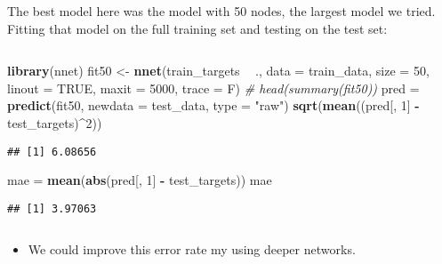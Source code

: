 \documentclass[10pt,ignorenonframetext,]{beamer}
\newenvironment{Shaded}{\begin{snugshade}}{\end{snugshade}}
\newcommand{\CommentTok}[1]{\textcolor[rgb]{0.56,0.35,0.01}{\textit{#1}}}
\newcommand{\DataTypeTok}[1]{\textcolor[rgb]{0.13,0.29,0.53}{#1}}
\newcommand{\DecValTok}[1]{\textcolor[rgb]{0.00,0.00,0.81}{#1}}
\newcommand{\KeywordTok}[1]{\textcolor[rgb]{0.13,0.29,0.53}{\textbf{#1}}}
\newcommand{\NormalTok}[1]{#1}
\newcommand{\OperatorTok}[1]{\textcolor[rgb]{0.81,0.36,0.00}{\textbf{#1}}}
\newcommand{\OtherTok}[1]{\textcolor[rgb]{0.56,0.35,0.01}{#1}}
\newcommand{\StringTok}[1]{\textcolor[rgb]{0.31,0.60,0.02}{#1}}
\providecommand{\tightlist}{%
  \setlength{\itemsep}{0pt}\setlength{\parskip}{0pt}}
\begin{document}
\begin{frame}[fragile]

The best model here was the model with 50 nodes, the largest model we
tried. Fitting that model on the full training set and testing on the
test set:

\(~\)

\scriptsize

\begin{Shaded}
\begin{Highlighting}[]
\KeywordTok{library}\NormalTok{(nnet)}
\NormalTok{fit50 <-}\StringTok{ }\KeywordTok{nnet}\NormalTok{(train_targets }\OperatorTok{~}\StringTok{ }\NormalTok{., }\DataTypeTok{data =}\NormalTok{ train_data, }\DataTypeTok{size =} \DecValTok{50}\NormalTok{, }\DataTypeTok{linout =} \OtherTok{TRUE}\NormalTok{, }
    \DataTypeTok{maxit =} \DecValTok{5000}\NormalTok{, }\DataTypeTok{trace =}\NormalTok{ F)}
\CommentTok{# head(summary(fit50))}
\NormalTok{pred =}\StringTok{ }\KeywordTok{predict}\NormalTok{(fit50, }\DataTypeTok{newdata =}\NormalTok{ test_data, }\DataTypeTok{type =} \StringTok{"raw"}\NormalTok{)}
\KeywordTok{sqrt}\NormalTok{(}\KeywordTok{mean}\NormalTok{((pred[, }\DecValTok{1}\NormalTok{] }\OperatorTok{-}\StringTok{ }\NormalTok{test_targets)}\OperatorTok{^}\DecValTok{2}\NormalTok{))}
\end{Highlighting}
\end{Shaded}

\begin{verbatim}
## [1] 6.08656
\end{verbatim}

\begin{Shaded}
\begin{Highlighting}[]
\NormalTok{mae =}\StringTok{ }\KeywordTok{mean}\NormalTok{(}\KeywordTok{abs}\NormalTok{(pred[, }\DecValTok{1}\NormalTok{] }\OperatorTok{-}\StringTok{ }\NormalTok{test_targets))}
\NormalTok{mae}
\end{Highlighting}
\end{Shaded}

\begin{verbatim}
## [1] 3.97063
\end{verbatim}

\(~\)

\normalsize

\begin{itemize}
\tightlist
\item
  We could improve this error rate my using deeper networks.
\end{itemize}

\end{frame}
\end{document}
